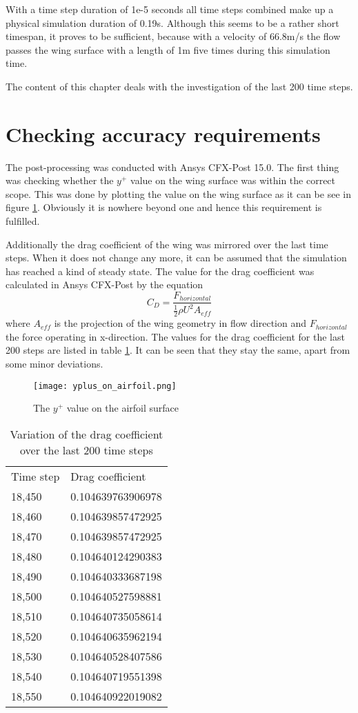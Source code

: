 With a time step duration of 1e-5 seconds all time steps combined make up a physical simulation duration of 0.19s. Although this seems to be a rather short timespan, it proves to be sufficient, because with a velocity of 66.8m/s the flow passes the wing surface with a length of 1m five times during this simulation time. 

The content of this chapter deals with the investigation of the last 200 time steps.
\section{Checking accuracy requirements}
The post-processing was conducted with Ansys CFX-Post 15.0. The first thing was checking whether the $y^+$ value on the wing surface was within the correct scope. This was done by plotting the value on the wing surface as it can be see in figure \ref{fig:yplus}. Obviously it is nowhere beyond one and hence this requirement is fulfilled.

Additionally the drag coefficient of the wing was mirrored over the last time steps. When it does not change any more, it can be assumed that the simulation has reached a kind of steady state. The value for the drag coefficient was calculated in Ansys CFX-Post by the equation \cite{ochoa}
\begin{equation}
C_D = \frac{F_{horizontal}}{\frac{1}{2} \rho U^2 A_{eff}}
\end{equation}
where $A_{eff}$ is the projection of the wing geometry in flow direction and $F_{horizontal}$ the force operating in x-direction.
The values for the drag coefficient for the last 200 steps are listed in table \ref{tab:htc_values}. It can be seen that they stay the same, apart from some minor deviations.
\begin{figure}[ht]
\centering
\texttt{[image: yplus\_on\_airfoil.png]}
\caption{The $y^+$ value on the airfoil surface}
\label{fig:yplus}
\end{figure}

\begin{table}[ht]
\centering
\caption{Variation of the drag coefficient over the last 200 time steps}
\label{tab:htc_values}
\begin{tabular}{ll}
Time step&Drag coefficient\\
18,450&0.104639763906978\\
18,460&0.104639857472925\\
18,470&0.104639857472925\\
18,480&0.104640124290383\\
18,490&0.104640333687198\\
18,500&0.104640527598881\\
18,510&0.104640735058614\\
18,520&0.104640635962194\\
18,530&0.104640528407586\\
18,540&0.104640719551398\\
18,550&0.104640922019082\\
\end{tabular}
\end{table}

